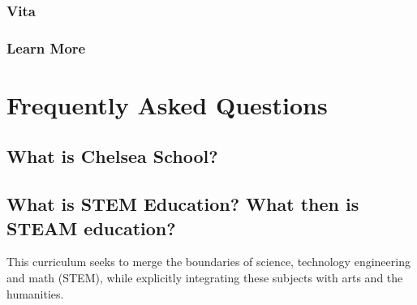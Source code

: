 \documentclass[letterpaper,10pt,english]{sphinxmanual}
\begin{document}
\subsection{Vita}
\label{faculty:id2}

\subsection{Learn More}
\label{faculty:id3}

\chapter{Frequently Asked Questions}
\label{faq::doc}\label{faq:index-0}\label{faq:frequently-asked-questions}

\section{What is Chelsea School?}
\label{faq:what-is-chelsea-school}

\section{What is STEM Education? What then is STEAM education?}
\label{faq:what-is-stem-education-what-then-is-steam-education}
This curriculum seeks to merge the boundaries of science, technology engineering and math (STEM), while explicitly integrating these subjects with arts and the humanities.
\end{document}
